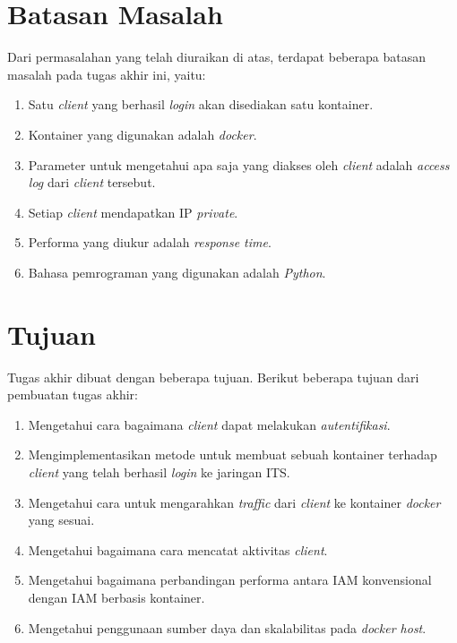 \section{Batasan Masalah}
Dari permasalahan yang telah diuraikan di atas, terdapat beberapa batasan masalah pada tugas akhir ini, yaitu:
\begin{enumerate}
	\item Satu \textit{client} yang berhasil \textit{login} akan disediakan satu kontainer.
	\item Kontainer yang digunakan adalah \textit{docker}.
	\item Parameter untuk mengetahui apa saja yang diakses oleh \textit{client} adalah \textit{access log} dari \textit{client} tersebut.
	\item Setiap \textit{client} mendapatkan IP \textit{private}.
	\item Performa yang diukur adalah \textit{response time}.
	\item Bahasa pemrograman yang digunakan adalah \textit{Python}.
\end{enumerate}

\section{Tujuan}
Tugas akhir dibuat dengan beberapa tujuan. Berikut beberapa tujuan dari pembuatan tugas akhir:
\begin{enumerate}
	\item Mengetahui cara bagaimana \textit{client} dapat melakukan \textit{autentifikasi}.
	\item Mengimplementasikan metode untuk membuat sebuah kontainer terhadap \textit{client} yang telah berhasil \textit{login} ke jaringan ITS.
	\item Mengetahui cara untuk mengarahkan \textit{traffic} dari \textit{client} ke kontainer \textit{docker} yang sesuai.
	\item Mengetahui bagaimana cara mencatat aktivitas \textit{client}.
	\item Mengetahui bagaimana perbandingan performa antara IAM konvensional dengan IAM berbasis kontainer.
	\item Mengetahui penggunaan sumber daya dan skalabilitas pada \textit{docker host}.
\end{enumerate}

